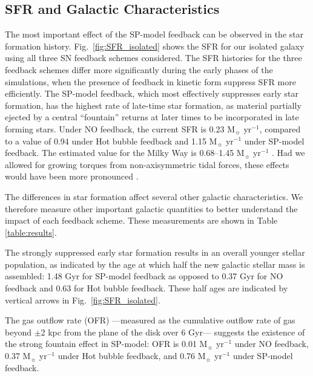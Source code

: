 \documentclass[iop]{emulateapj}
\begin{document}
\subsection{SFR and Galactic Characteristics}\label{subsec:res_sfr}
The most important effect of the SP-model feedback can be observed in the star formation history. Fig.~\ref{fig:SFR_isolated} shows the SFR for our isolated galaxy using all three SN feedback schemes considered. The SFR histories for the three feedback schemes differ more significantly during the early phases of the simulations, when the presence of feedback in kinetic form suppress SFR more efficiently. The SP-model feedback, which most effectively suppresses early star formation, has the highest rate of late-time star formation, as material partially ejected by a central ``fountain'' returns at later times to be incorporated in late forming stars. Under NO feedback, the current SFR is 0.23 M$_{\sun}$ yr$^{-1}$, compared to a value of 0.94 under Hot bubble feedback and 1.15 M$_{\sun}$ yr$^{-1}$ under SP-model feedback. The estimated value for the Milky Way is 0.68--1.45 M$_{\sun}$ yr$^{-1}$ \citep{Robitaille2010}. Had we allowed for growing torques from non-axisymmetric tidal forces, these effects would have been more pronounced \citep[see e.g.,][]{Brook14, Uebler14}.

The differences in star formation affect several other galactic characteristics. We therefore measure other important galactic quantities to better understand the impact of each feedback scheme. These measurements are shown in Table \ref{table:results}.

The strongly suppressed early star formation results in an overall younger stellar population, as indicated by the age at which half the new galactic stellar mass is assembled: 1.48 Gyr for SP-model feedback as opposed to 0.37 Gyr for NO feedback and 0.63 for Hot bubble feedback. These half ages are indicated by vertical arrows in Fig.~\ref{fig:SFR_isolated}.

The gas outflow rate (OFR) ---measured as the cumulative outflow rate of gas beyond $\pm$2 kpc from the plane of the disk over 6 Gyr--- suggests the existence of the strong fountain effect in SP-model: OFR is 0.01 M$_{\sun}$ yr$^{-1}$ under NO feedback, 0.37 M$_{\sun}$ yr$^{-1}$ under Hot bubble feedback, and 0.76 M$_{\sun}$ yr$^{-1}$ under SP-model feedback.
\end{document}
